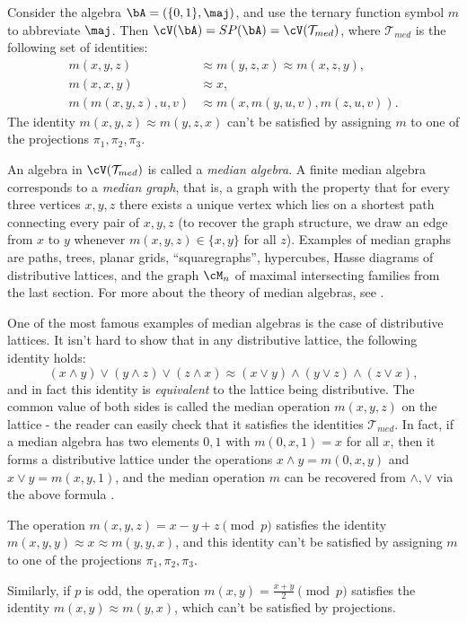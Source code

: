 \begin{ex} Consider the algebra $\bA = (\{0,1\}, \maj)$, and use the ternary function symbol $m$ to abbreviate $\maj$. Then $\cV(\bA) = SP(\bA) = \cV(\mathcal{T}_{med})$, where $\mathcal{T}_{med}$ is the following set of identities:
\begin{align*}
m(x,y,z) &\approx m(y,z,x) \approx m(x,z,y),\\
m(x,x,y) &\approx x,\\
m(m(x,y,z),u,v) &\approx m(x,m(y,u,v),m(z,u,v)).
\end{align*}
The identity $m(x,y,z) \approx m(y,z,x)$ can't be satisfied by assigning $m$ to one of the projections $\pi_1, \pi_2, \pi_3$.

An algebra in $\cV(\mathcal{T}_{med})$ is called a \emph{median algebra}. A finite median algebra corresponds to a \emph{median graph}, that is, a graph with the property that for every three vertices $x,y,z$ there exists a unique vertex which lies on a shortest path connecting every pair of $x,y,z$ (to recover the graph structure, we draw an edge from $x$ to $y$ whenever $m(x,y,z) \in \{x,y\}$ for all $z$). Examples of median graphs are paths, trees, planar grids, ``squaregraphs'', hypercubes, Hasse diagrams of distributive lattices, and the graph $\cM_n$ of maximal intersecting families from the last section. For more about the theory of median algebras, see \cite{median-poc}.

One of the most famous examples of median algebras is the case of distributive lattices. It isn't hard to show that in any distributive lattice, the following identity holds:
\[
(x \wedge y) \vee (y \wedge z) \vee (z \wedge x) \approx (x \vee y) \wedge (y \vee z) \wedge (z \vee x),
\]
and in fact this identity is \emph{equivalent} to the lattice being distributive. The common value of both sides is called the median operation $m(x,y,z)$ on the lattice - the reader can easily check that it satisfies the identities $\mathcal{T}_{med}$. In fact, if a median algebra has two elements $0,1$ with $m(0,x,1) = x$ for all $x$, then it forms a distributive lattice under the operations $x \wedge y = m(0,x,y)$ and $x\vee y = m(x,y,1)$, and the median operation $m$ can be recovered from $\wedge, \vee$ via the above formula \cite{median-distributive}.
\end{ex}

\begin{ex} The operation $m(x,y,z) = x - y + z \pmod{p}$ satisfies the identity $m(x,y,y) \approx x \approx m(y,y,x)$, and this identity can't be satisfied by assigning $m$ to one of the projections $\pi_1, \pi_2, \pi_3$.

Similarly, if $p$ is odd, the operation $m(x,y) = \frac{x+y}{2} \pmod{p}$ satisfies the identity $m(x,y) \approx m(y,x)$, which can't be satisfied by projections.
\end{ex}

